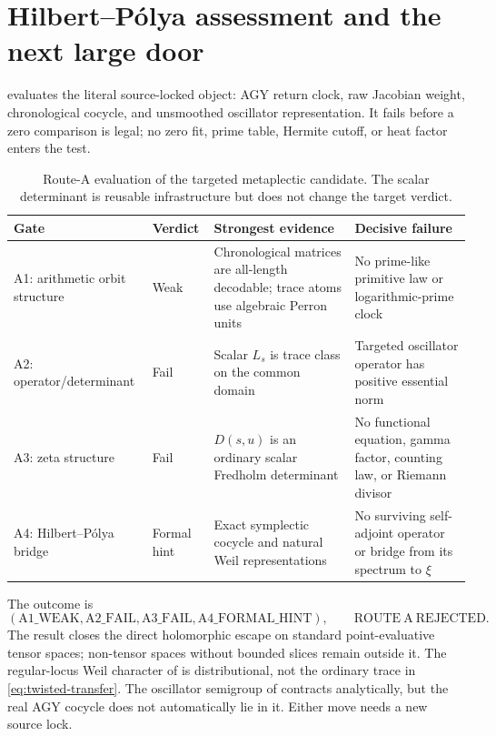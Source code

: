 \section{Hilbert--P\'olya assessment and the next large door}
\label{sec:route-a}

 evaluates the literal source-locked object: AGY return
clock, raw Jacobian weight, chronological cocycle, and unsmoothed oscillator
representation.  It fails before a zero comparison is legal; no zero fit,
prime table, Hermite cutoff, or heat factor enters the test.

\begin{table}[t]
\centering
\caption{Route-A evaluation of the targeted metaplectic candidate.  The
scalar determinant is reusable infrastructure but does not change the
target verdict.}
\label{tab:route-a}
\small
\begin{tabularx}{\textwidth}{@{}l l
 >{\raggedright\arraybackslash}X
 >{\raggedright\arraybackslash}X@{}}
\toprule
Gate & Verdict & Strongest evidence & Decisive failure \\
\midrule
A1: arithmetic orbit structure & Weak & Chronological matrices are
all-length decodable; trace atoms use algebraic Perron units & No prime-like
primitive law or logarithmic-prime clock \\
A2: operator/determinant & Fail & Scalar \(L_s\) is trace class on the common
domain & Targeted oscillator operator has positive essential norm \\
A3: zeta structure & Fail & \(D(s,u)\) is an ordinary scalar Fredholm
determinant & No functional equation, gamma factor, counting law, or Riemann
divisor \\
A4: Hilbert--P\'olya bridge & Formal hint & Exact symplectic cocycle and
natural Weil representations & No surviving self-adjoint operator or bridge
from its spectrum to \(\xi\) \\
\bottomrule
\end{tabularx}
\end{table}

The outcome is
\[
 (\mathrm{A1\_WEAK},\mathrm{A2\_FAIL},
   \mathrm{A3\_FAIL},\mathrm{A4\_FORMAL\_HINT}),
 \qquad \mathrm{ROUTE\ A\ REJECTED}.
\]
The result closes the direct holomorphic escape on standard point-evaluative
tensor spaces; non-tensor spaces without bounded slices remain outside it.
The regular-locus Weil character of \citet{thomas2008} is distributional,
not the ordinary trace in \eqref{eq:twisted-transfer}.  The oscillator
semigroup of \citet{hilgert1989} contracts analytically, but the real AGY
cocycle does not automatically lie in it.  Either move needs a new source
lock.

